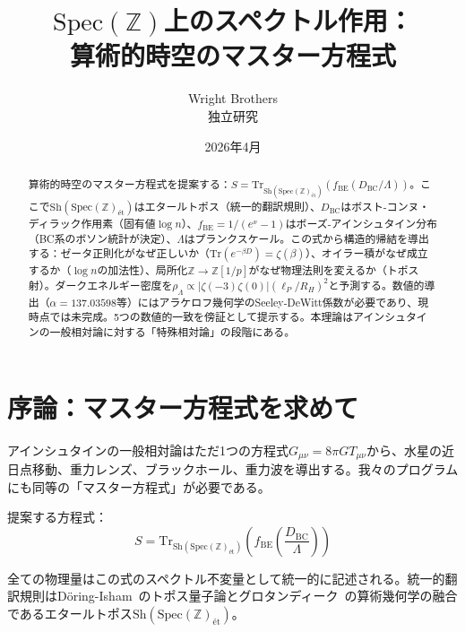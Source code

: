 \documentclass[11pt,a4paper]{article}
\newcommand{\Spec}{\mathrm{Spec}}
\newcommand{\Sh}{\mathrm{Sh}}
\newcommand{\Zp}{\mathbb{Z}[1/p]}
\begin{document}
\title{$\Spec(\mathbb{Z})$上のスペクトル作用：\\算術的時空のマスター方程式}
\author{Wright Brothers\\{\small 独立研究}}
\date{2026年4月}
\maketitle

\begin{abstract}
算術的時空のマスター方程式を提案する：$S = \mathrm{Tr}_{\Sh(\Spec(\mathbb{Z})_{\text{ét}})}(f_{\mathrm{BE}}(D_{\mathrm{BC}}/\Lambda))$。ここで$\Sh(\Spec(\mathbb{Z})_{\text{ét}})$はエタールトポス（統一的翻訳規則）、$D_{\mathrm{BC}}$はボスト-コンヌ・ディラック作用素（固有値$\log n$）、$f_{\mathrm{BE}} = 1/(e^x-1)$はボーズ-アインシュタイン分布（BC系のボソン統計が決定）、$\Lambda$はプランクスケール。この式から構造的帰結を導出する：ゼータ正則化がなぜ正しいか（$\mathrm{Tr}(e^{-\beta D}) = \zeta(\beta)$）、オイラー積がなぜ成立するか（$\log n$の加法性）、局所化$\mathbb{Z}\to\Zp$がなぜ物理法則を変えるか（トポス射）。ダークエネルギー密度を$\rho_\Lambda \propto |\zeta(-3)\zeta(0)|(\ell_P/R_H)^2$と予測する。数値的導出（$\alpha = 137.03598$等）にはアラケロフ幾何学のSeeley-DeWitt係数が必要であり、現時点では未完成。5つの数値的一致を傍証として提示する。本理論はアインシュタインの一般相対論に対する「特殊相対論」の段階にある。
\end{abstract}

\tableofcontents

\section{序論：マスター方程式を求めて}

アインシュタインの一般相対論はただ1つの方程式$G_{\mu\nu} = 8\pi G T_{\mu\nu}$から、水星の近日点移動、重力レンズ、ブラックホール、重力波を導出する。我々のプログラムにも同等の「マスター方程式」が必要である。

提案する方程式：
\begin{equation}
\boxed{S = \mathrm{Tr}_{\Sh(\Spec(\mathbb{Z})_{\text{ét}})} \left( f_{\mathrm{BE}} \left( \frac{D_{\mathrm{BC}}}{\Lambda} \right) \right)}
\label{eq:master}
\end{equation}

全ての物理量はこの式のスペクトル不変量として統一的に記述される。統一的翻訳規則はDöring-Isham~\cite{DoeringIsham2008}のトポス量子論とグロタンディーク~\cite{Grothendieck}の算術幾何学の融合であるエタールトポス$\Sh(\Spec(\mathbb{Z})_{\text{ét}})$。
\end{document}
